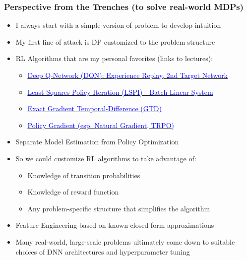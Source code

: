 \documentclass[handout]{beamer}
\begin{document}
\begin{frame}
\frametitle{Perspective from the Trenches (to solve real-world MDPs)}
\pause
\begin{itemize}[<+->]
\item I always start with a simple version of problem to develop intuition
\item My first line of attack is DP customized to the problem structure
\item RL Algorithms that are my personal favorites (links to lectures):
\begin{itemize}
\item \href{https://github.com/coverdrive/technical-documents/blob/master/finance/cme241/Tour-Batch.pdf}{\underline{\textcolor{blue}{Deep Q-Network (DQN): Experience Replay, 2nd Target Network}}}
\item \href{https://github.com/coverdrive/technical-documents/blob/master/finance/cme241/Tour-Batch.pdf}{\underline{\textcolor{blue}{Least Squares Policy Iteration (LSPI) - Batch Linear System}}}
\item \href {https://github.com/coverdrive/technical-documents/blob/master/finance/cme241/ValueFunctionGeometry.pdf}{\underline{\textcolor{blue}{Exact Gradient Temporal-Difference (GTD)}}}
\item \href{https://github.com/coverdrive/technical-documents/blob/master/finance/cme241/PolicyGradient.pdf}{\underline{\textcolor{blue}{Policy Gradient (esp. Natural Gradient, TRPO)}}}
\end{itemize}
\item Separate Model Estimation from Policy Optimization
\item So we could customize RL algorithms to take advantage of:
\begin{itemize}
\item Knowledge of transition probabilities
\item Knowledge of reward function
\item Any problem-specific structure that simplifies the algorithm
\end{itemize}
\item Feature Engineering based on known closed-form approximations
\item Many real-world, large-scale problems ultimately come down to
suitable choices of DNN architectures and hyperparameter tuning
\end{itemize}
\end{frame}
\end{document}
